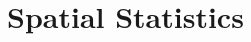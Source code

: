 \documentclass[8pt]{extarticle}
\begin{document}












\section{Spatial Statistics}
\end{document}
